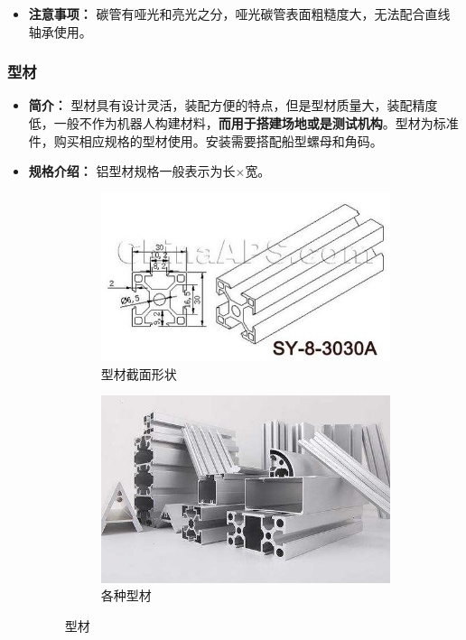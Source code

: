 \documentclass[UTF8]{article} %
\begin{document}
\begin{itemize}
  \item \textbf{注意事项：} 碳管有哑光和亮光之分，哑光碳管表面粗糙度大，无法配合直线轴承使用。

\end{itemize}

\subsubsection{型材}
\begin{itemize}
  \item \textbf{简介：} 型材具有设计灵活，装配方便的特点，但是型材质量大，装配精度低，一般不作为机器人构建材料，\textbf{而用于搭建场地或是测试机构}。型材为标准件，购买相应规格的型材使用。安装需要搭配船型螺母和角码。


  \item \textbf{规格介绍：} 铝型材规格一般表示为长$\times$宽。

  \begin{figure}[H]
    \centering
    \begin{subfigure}[b]{0.39\textwidth}
           \centering
           \includegraphics[width=\textwidth]{xing1.png}
            \caption{型材截面形状}
    \end{subfigure}
    \quad
    \begin{subfigure}[b]{0.4\textwidth}
            \centering
            \includegraphics[width=\textwidth]{xing2.png}
            \caption{各种型材}
    \end{subfigure}
    \caption{型材}
  \end{figure}


\end{itemize}
\end{document}
